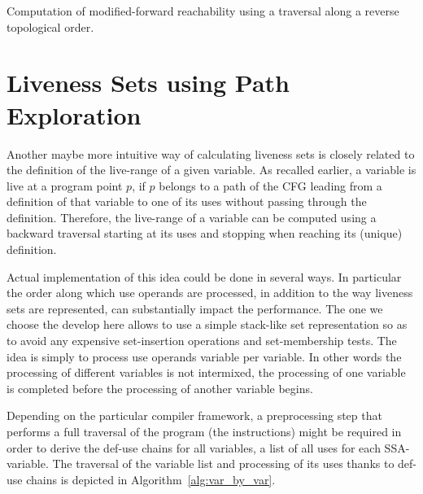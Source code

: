 \begin{algorithm}
\caption{Computation of modified-forward reachability using a traversal along a reverse topological order.}
\label{alg:computeFR}
\end{algorithm}

\section{Liveness Sets using Path Exploration}
\label{sec:path-explore}

Another maybe more intuitive way of calculating liveness sets is closely related to the definition of the live-range of a given variable.
As recalled earlier, a variable is live at a program point $p$, if $p$ belongs to a path of the CFG leading from a definition of that variable to one of its uses without passing through the definition.
Therefore, the live-range of a variable can be computed using a backward traversal starting at its uses and stopping when reaching its (unique) definition.

Actual implementation of this  idea could be done in several ways.
In particular the order along which use operands are processed, in addition to the way liveness sets are represented, can substantially impact the performance.
The one we choose the develop here allows to use a simple stack-like set representation so as to avoid any expensive set-insertion operations and set-membership tests.
The idea is simply to process use operands variable per variable.
In other words the processing of different variables is not intermixed, \ie the processing of one variable is completed before the processing of another variable begins.

Depending on the particular compiler framework, a preprocessing step that performs a full traversal of the program (\ie the instructions) might be required in order to derive the def-use chains for all variables, \ie a list of all uses for each SSA-variable.
The traversal of the variable list and processing of its uses thanks to def-use chains is depicted in Algorithm~\ref{alg:var_by_var}.

